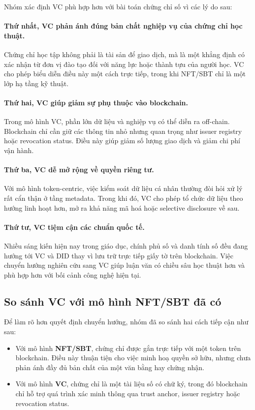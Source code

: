 Nhóm xác định VC phù hợp hơn với bài toán chứng chỉ số vì các lý do sau:

\paragraph{Thứ nhất, VC phản ánh đúng bản chất nghiệp vụ của chứng chỉ học thuật.}
Chứng chỉ học tập không phải là tài sản để giao dịch, mà là một khẳng định có xác nhận từ đơn vị đào tạo đối với năng lực hoặc thành tựu của người học. VC cho phép biểu diễn điều này một cách trực tiếp, trong khi NFT/SBT chỉ là một lớp hạ tầng kỹ thuật.

\paragraph{Thứ hai, VC giúp giảm sự phụ thuộc vào blockchain.}
Trong mô hình VC, phần lớn dữ liệu và nghiệp vụ có thể diễn ra off-chain. Blockchain chỉ cần giữ các thông tin nhỏ nhưng quan trọng như issuer registry hoặc revocation status. Điều này giúp giảm số lượng giao dịch và giảm chi phí vận hành.

\paragraph{Thứ ba, VC dễ mở rộng về quyền riêng tư.}
Với mô hình token-centric, việc kiểm soát dữ liệu cá nhân thường đòi hỏi xử lý rất cẩn thận ở tầng metadata. Trong khi đó, VC cho phép tổ chức dữ liệu theo hướng linh hoạt hơn, mở ra khả năng mã hoá hoặc selective disclosure về sau.

\paragraph{Thứ tư, VC tiệm cận các chuẩn quốc tế.}
Nhiều sáng kiến hiện nay trong giáo dục, chính phủ số và danh tính số đều đang hướng tới VC và DID thay vì lưu trữ trực tiếp giấy tờ trên blockchain. Việc chuyển hướng nghiên cứu sang VC giúp luận văn có chiều sâu học thuật hơn và phù hợp hơn với bối cảnh công nghệ hiện tại.

\subsection{So sánh VC với mô hình NFT/SBT đã có}

Để làm rõ hơn quyết định chuyển hướng, nhóm đã so sánh hai cách tiếp cận như sau:

\begin{itemize}
    \item Với mô hình \textbf{NFT/SBT}, chứng chỉ được gắn trực tiếp với một token trên blockchain. Điều này thuận tiện cho việc minh hoạ quyền sở hữu, nhưng chưa phản ánh đầy đủ bản chất của một văn bằng hay chứng nhận.
    \item Với mô hình \textbf{VC}, chứng chỉ là một tài liệu số có chữ ký, trong đó blockchain chỉ hỗ trợ quá trình xác minh thông qua trust anchor, issuer registry hoặc revocation status.
\end{itemize}

